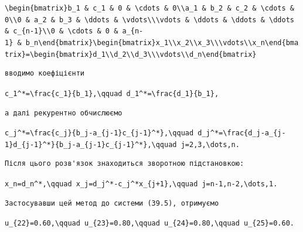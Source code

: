 \documentclass[
  ukrainian,
]{article}
\begin{document}
\texttt{\textbackslash{}begin\{bmatrix\}b\_1\ \&\ c\_1\ \&\ 0\ \&\ \textbackslash{}cdots\ \&\ 0\textbackslash{}\textbackslash{}a\_1\ \&\ b\_2\ \&\ c\_2\ \&\ \textbackslash{}cdots\ \&\ 0\textbackslash{}\textbackslash{}0\ \&\ a\_2\ \&\ b\_3\ \&\ \textbackslash{}ddots\ \&\ \textbackslash{}vdots\textbackslash{}\textbackslash{}\textbackslash{}vdots\ \&\ \textbackslash{}ddots\ \&\ \textbackslash{}ddots\ \&\ \textbackslash{}ddots\ \&\ c\_\{n-1\}\textbackslash{}\textbackslash{}0\ \&\ \textbackslash{}cdots\ \&\ 0\ \&\ a\_\{n-1\}\ \&\ b\_n\textbackslash{}end\{bmatrix\}\textbackslash{}begin\{bmatrix\}x\_1\textbackslash{}\textbackslash{}x\_2\textbackslash{}\textbackslash{}x\_3\textbackslash{}\textbackslash{}\textbackslash{}vdots\textbackslash{}\textbackslash{}x\_n\textbackslash{}end\{bmatrix\}=\textbackslash{}begin\{bmatrix\}d\_1\textbackslash{}\textbackslash{}d\_2\textbackslash{}\textbackslash{}d\_3\textbackslash{}\textbackslash{}\textbackslash{}vdots\textbackslash{}\textbackslash{}d\_n\textbackslash{}end\{bmatrix\}}

\begin{verbatim}
вводимо коефіцієнти
\end{verbatim}

\texttt{c\_1\^{}*=\textbackslash{}frac\{c\_1\}\{b\_1\},\textbackslash{}qquad\ d\_1\^{}*=\textbackslash{}frac\{d\_1\}\{b\_1\},}

\begin{verbatim}
а далі рекурентно обчислюємо
\end{verbatim}

\texttt{c\_j\^{}*=\textbackslash{}frac\{c\_j\}\{b\_j-a\_\{j-1\}c\_\{j-1\}\^{}*\},\textbackslash{}qquad\ d\_j\^{}*=\textbackslash{}frac\{d\_j-a\_\{j-1\}d\_\{j-1\}\^{}*\}\{b\_j-a\_\{j-1\}c\_\{j-1\}\^{}*\},\textbackslash{}qquad\ j=2,3,\textbackslash{}dots,n.}

\begin{verbatim}
Після цього розв'язок знаходиться зворотною підстановкою:
\end{verbatim}

\texttt{x\_n=d\_n\^{}*,\textbackslash{}qquad\ x\_j=d\_j\^{}*-c\_j\^{}*x\_\{j+1\},\textbackslash{}qquad\ j=n-1,n-2,\textbackslash{}dots,1.}

\begin{verbatim}
Застосувавши цей метод до системи (39.5), отримуємо
\end{verbatim}

\texttt{u\_\{22\}=0.60,\textbackslash{}qquad\ u\_\{23\}=0.80,\textbackslash{}qquad\ u\_\{24\}=0.80,\textbackslash{}qquad\ u\_\{25\}=0.60.}
\end{document}
